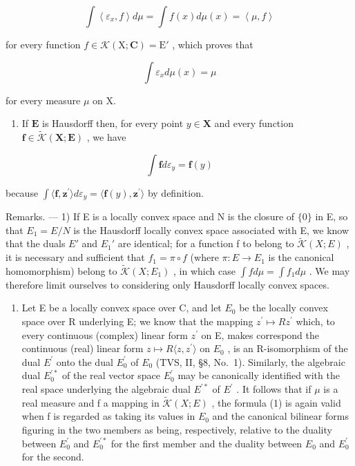 \[
\int \left\langle \varepsilon_ {x}, f \right\rangle d \mu = \int f (x) d \mu (x) = \left\langle \mu , f \right\rangle
\]

for every function \(f \in \mathcal{K}(\mathrm{X};\mathbf{C}) = \mathrm{E}'\) , which proves that

\[
\int \varepsilon_ {x} d \mu (x) = \mu
\]

for every measure \(\mu\) on X.

\begin{enumerate}
\def\labelenumi{\arabic{enumi})}
\setcounter{enumi}{2}
\tightlist
\item
  If \(\mathbf{E}\) is Hausdorff then, for every point \(y \in \mathbf{X}\) and every function \(\mathbf{f} \in \widetilde{\mathcal{K}}(\mathbf{X};\mathbf{E})\) , we have
\end{enumerate}

\[
\int \mathbf {f} d \varepsilon_ {y} = \mathbf {f} (y)
\]

because \(\int \langle \mathbf{f},\mathbf{z}^{\prime}\rangle d\varepsilon_{y} = \langle \mathbf{f}(y),\mathbf{z}^{\prime}\rangle\) by definition.

Remarks. --- 1) If E is a locally convex space and N is the closure of \(\{0\}\) in E, so that \(E_{1} = E/N\) is the Hausdorff locally convex space associated with E, we know that the duals \(E'\) and \(E_{1}'\) are identical; for a function f to belong to \(\widetilde{\mathcal{K}}(X;E)\) , it is necessary and sufficient that \(f_{1} = \pi \circ f\) (where \(\pi : E \to E_{1}\) is the canonical homomorphism) belong to \(\widetilde{\mathcal{K}}(X;E_{1})\) , in which case \(\int f d\mu = \int f_{1} d\mu\) . We may therefore limit ourselves to considering only Hausdorff locally convex spaces.

\begin{enumerate}
\def\labelenumi{\arabic{enumi})}
\setcounter{enumi}{1}
\tightlist
\item
  Let E be a locally convex space over C, and let \(E_{0}\) be the locally convex space over R underlying E; we know that the mapping \(z^{\prime} \mapsto Rz^{\prime}\) which, to every continuous (complex) linear form \(z^{\prime}\) on E, makes correspond the continuous (real) linear form \(z \mapsto R\langle z, z^{\prime} \rangle\) on \(E_{0}\) , is an R-isomorphism of the dual \(E^{\prime}\) onto the dual \(E_{0}^{\prime}\) of \(E_{0}\) (TVS, II, §8, No.~1). Similarly, the algebraic dual \(E_{0}^{\prime *}\) of the real vector space \(E_{0}^{\prime}\) may be canonically identified with the real space underlying the algebraic dual \(E^{\prime *}\) of \(E^{\prime}\) . It follows that if \(\mu\) is a real measure and f a mapping in \(\widetilde{\mathcal{K}}(X;E)\) , the formula (1) is again valid when f is regarded as taking its values in \(E_{0}\) and the canonical bilinear forms figuring in the two members as being, respectively, relative to the duality between \(E_{0}^{\prime}\) and \(E_{0}^{\prime *}\) for the first member and the duality between \(E_{0}\) and \(E_{0}^{\prime}\) for the second.
\end{enumerate}

